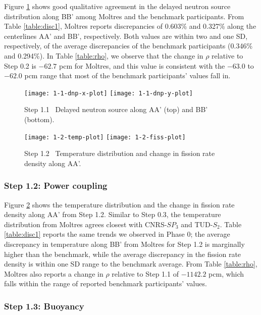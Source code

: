 Figure \ref{fig:1.1} shows good qualitative agreement in the delayed neutron
source distribution along BB' among Moltres and the benchmark participants.
From Table \ref{table:disc1}, Moltres reports discrepancies of 0.603\% and
0.327\% along the centerlines AA' and BB', respectively. Both values are
within two and one \gls{SD}, respectively, of the average discrepancies of the
benchmark participants (0.346\% and 0.294\%).
In Table \ref{table:rho}, we observe that the change in
$\rho$ relative to Step 0.2 is $-62.7$ pcm for Moltres, and this value is
consistent with the $-63.0$ to $-62.0$ pcm range that most of the benchmark
participants' values fall in.
%
\begin{figure}[htb]
	\centering
    \texttt{[image: 1-1-dnp-x-plot]}
    \texttt{[image: 1-1-dnp-y-plot]}
	\caption{Step 1.1 \textemdash\ Delayed neutron source along AA' (top) and BB'
	(bottom).}
	\label{fig:1.1}
\end{figure}
%
\begin{figure}[htb]
	\centering
	\texttt{[image: 1-2-temp-plot]}
	\texttt{[image: 1-2-fiss-plot]}
	\caption{Step 1.2 \textemdash\ Temperature distribution and change in fission rate
	density along AA'.}
	\label{fig:1.2}
\end{figure}

\FloatBarrier

\subsubsection{Step 1.2: Power coupling}

Figure \ref{fig:1.2} shows the temperature distribution and the change in
fission rate density along AA' from Step 1.2. Similar to Step 0.3, the
temperature distribution from Moltres agrees closest with CNRS-$SP_3$ and
TUD-$S_2$. Table \ref{table:disc1} reports the same trends we observed in Phase
0; the average discrepancy in temperature along BB' from Moltres for Step 1.2
is marginally higher than the benchmark, while the average discrepancy in the
fission rate density is within one \gls{SD} range to the benchmark average.
From Table \ref{table:rho}, Moltres also reports a change in $\rho$
relative to Step 1.1 of $-1142.2$ pcm, which
falls within the range of reported benchmark participants' values.

\subsubsection{Step 1.3: Buoyancy}

